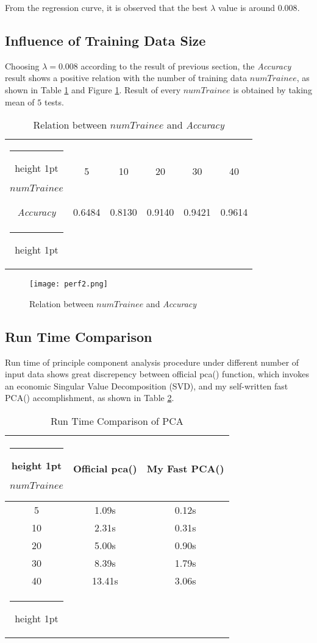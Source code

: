 \documentclass[10pt,journal]{IEEEtran}
\makeatletter
\newcommand{\thickhline}{%
			\noalign {\ifnum 0=`}\fi \hrule height 1pt
			\futurelet \reserved@a \@xhline
		}
\renewcommand{\[}{\begin{equation*} \begin{aligned}} %
\renewcommand{\]}{\end{aligned} \end{equation*}}
\makeatother
\begin{document}
From the regression curve, it is observed that the best $\lambda$ value is around $0.008$.

\subsection{\large Influence of Training Data Size}
Choosing $\lambda = 0.008$ according to the result of previous section, the \textit{Accuracy} result shows a positive relation with the number of training data $numTrainee$, as shown in Table \ref{tab:perf2} and Figure \ref{fig:perf2}. Result of every $numTrainee$ is obtained by taking mean of $5$ tests.
\vspace{8pt}
\begin{table}[H]
	\centering
	\begin{tabular}{c||ccccc}
		\thickhline
		$numTrainee$ & 5 & 10 & 20 & 30 & 40 \\
		\textit{Accuracy} & 0.6484 & 0.8130 & 0.9140 & 0.9421 & 0.9614 \\ \thickhline
	\end{tabular}
	\vspace{6pt}
	\caption{Relation between $numTrainee$ and \textit{Accuracy}} \label{tab:perf2}
\end{table}
\begin{figure}[H]
	\centering
	\texttt{[image: perf2.png]}
	\caption{Relation between $numTrainee$ and \textit{Accuracy}} \label{fig:perf2}
\end{figure}

\subsection{\large Run Time Comparison}
Run time of principle component analysis procedure under different number of input data shows great discrepency between official pca() function, which invokes an economic Singular Value Decomposition (SVD), and my self-written fast PCA() accomplishment, as shown in Table \ref{tab:perf3}.
\vspace{8pt}
\begin{table}[H]
	\centering
	\begin{tabular}{c||cc}
		\thickhline
		$numTrainee$ & Official pca() & My Fast PCA() \\ \hline
		5 & 1.09s & 0.12s \\ 
		10 & 2.31s & 0.31s \\ 
		20 & 5.00s & 0.90s \\ 
		30 & 8.39s & 1.79s \\ 
		40 & 13.41s & 3.06s \\ \thickhline
	\end{tabular}
	\vspace{6pt}
	\caption{Run Time Comparison of PCA} \label{tab:perf3}
\end{table}
\end{document}
